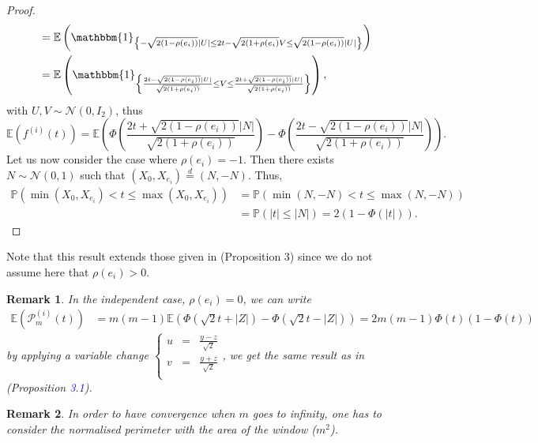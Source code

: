 \documentclass[12pt]{article}
\theoremstyle{Theorem}
\newtheorem{remark}{Remark}
\begin{document}
\begin{proof}
{\begin{align*}
& = \mathbb{E}\left(\mathbbm{1}_{\left\{ - \sqrt{2(1-\rho(e_i))}\left|U\right| \leq 2t - \sqrt{2(1+\rho(e_i)}V \leq \sqrt{2(1-\rho(e_i))}\left|U\right| \right\}}\right) \\
& = \mathbb{E}\left(\mathbbm{1}_{\left\{\frac{2t - \sqrt{2(1-\rho(e_i))}|U|}{\sqrt{2(1+\rho(e_i))}}  \leq V \leq \frac{2t + \sqrt{2(1-\rho(e_i))}|U|}{\sqrt{2(1+\rho(e_i))}}\right\}}\right), 
\end{align*}}  
with $U, V \sim \mathcal{N}(0,I_{2})$, thus 
$$\mathbb{E}\left(f^{(i)}(t)\right) = \mathbb{E}\left(\Phi\left(\dfrac{2t + \sqrt{2(1-\rho(e_i))}|N|}{\sqrt{2(1+\rho(e_i))}}\right)  - \Phi\left(\dfrac{2t - \sqrt{2(1-\rho(e_i))}|N|}{\sqrt{2(1+\rho(e_i))}}\right)\right).$$
Let us now consider the case where $\rho(e_i) = -1$. Then there exists $N \sim \mathcal{N}\left(0,1\right)$ such that $\left(X_{\scriptscriptstyle 0}, X_{e_i}\right) \overset{d}{=} \left(N, -N\right)$. Thus, 
\begin{align*}
\mathbb{P}\left(\min\left(X_{\scriptscriptstyle 0}, X_{e_i}\right) < t \leq \max\left(X_{\scriptscriptstyle 0}, X_{e_i}\right)\right) & = \mathbb{P}\left(\min\left(N, -N\right) < t \leq \max\left(N, -N\right)\right) \\
& = \mathbb{P}\left(|t| \leq |N|\right) = 2\left(1 - \Phi\left(|t|\right)\right).
\end{align*}
\end{proof}
Note that this result extends those given in \cite{HermineAgnes} (Proposition 3) since we do not assume here that $\rho(e_i) > 0$. 
\begin{remark}
\label{iidCase}
In the independent case, $\rho(e_i) = 0$, we can write
{\small
\begin{align*}
\mathbb{E}\left(\mathcal{P}^{\scriptscriptstyle  (i)}_{m}(t) \right) & = m(m-1)\mathbb{E}\left(\Phi\left(\sqrt{2}t + |Z|\right) - \Phi\left(\sqrt{2}t - |Z|\right)\right) = 2m(m-1)\Phi(t)\left(1-\Phi(t)\right) 
\end{align*}}
by applying a variable change {\small$\left\{\begin{array}{rcl}
u & = & \frac{y - z}{\sqrt{2}} \\
v & = & \frac{y+z}{\sqrt{2}} \\
\end{array}\right.$}, we get the same result as in \cite{Psymetrie} (Proposition \textcolor{blue}{3.1}).
\end{remark}
\begin{remark}
In order to have convergence when $m$ goes to infinity, one has to consider the normalised perimeter with the area of the window ($m^2$).
\end{remark}
\end{document}
